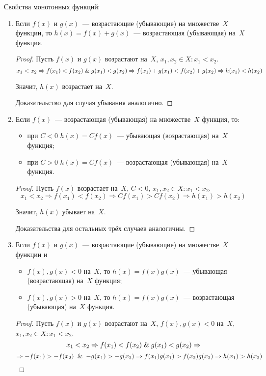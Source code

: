 Свойства монотонных функций:
\begin{enumerate}
	\item Если $f(x)$ и $g(x)$~--- возрастающие (убывающие) на множестве~$X$ функции, то $h(x) = f(x) + g(x)$~--- возрастающая (убывающая) на~$X$ функция.
	\begin{proof}
	Пусть $f(x)$ и $g(x)$ возрастают на~$X$, $x_1, x_2 \in X \colon x_1 < x_2$.
	\begin{equation*}
	x_1 < x_2 \Rightarrow
	f(x_1) < f(x_2) \mathrel{\&} g(x_1) < g(x_2) \Rightarrow
	f(x_1) + g(x_1) < f(x_2) + g(x_2) \Rightarrow
	h(x_1) < h(x_2)
	\end{equation*}
	
	Значит, $h(x)$ возрастает на~$X$.
	
	Доказательство для случая убывания аналогично.
	\end{proof}
	
	\item Если $f(x)$~--- возрастающая (убывающая) на множестве~$X$ функция, то:
	\begin{itemize}
		\item при $C < 0$ $h(x) = Cf(x)$~--- убывающая (возрастающая) на~$X$ функция;
		\item при $C > 0$ $h(x) = Cf(x)$~--- возрастающая (убывающая) на~$X$ функция.
	\end{itemize}
	\begin{proof}
	Пусть $f(x)$ возрастает на~$X$, $C < 0$, $x_1, x_2 \in X \colon x_1 < x_2$.
	\begin{equation*}
	x_1 < x_2 \Rightarrow
	f(x_1) < f(x_2) \Rightarrow
	C f(x_1) > C f(x_2) \Rightarrow
	h(x_1) > h(x_2)
	\end{equation*}
	
	Значит, $h(x)$ убывает на~$X$.
	
	Доказательства для остальных трёх случаев аналогичны.
	\end{proof}
	
	\item Если $f(x)$ и $g(x)$~--- возрастающие (убывающие) на множестве~$X$ функции и
	\begin{itemize}
		\item $f(x), g(x) < 0$ на~$X$, то $h(x) = f(x)g(x)$~--- убывающая (возрастающая) на~$X$ функция;
		\item $f(x), g(x) > 0$ на~$X$, то $h(x) = f(x)g(x)$~--- возрастающая (убывающая) на~$X$ функция.
	\end{itemize}
	\begin{proof}
	Пусть $f(x)$ и $g(x)$ возрастают на~$X$, $f(x), g(x) < 0$ на~$X$, $x_1, x_2 \in X \colon x_1 < x_2$.
	\begin{equation*}
	x_1 < x_2 \Rightarrow
	f(x_1) < f(x_2) \mathrel{\&} g(x_1) < g(x_2) \Rightarrow
	\end{equation*}
	\begin{equation*}
	\Rightarrow -f(x_1) > -f(x_2) \And -g(x_1) > -g(x_2) \Rightarrow
	f(x_1)g(x_1) > f(x_2)g(x_2) \Rightarrow
	h(x_1) > h(x_2)
	\end{equation*}
	

\end{proof}
\end{enumerate}

